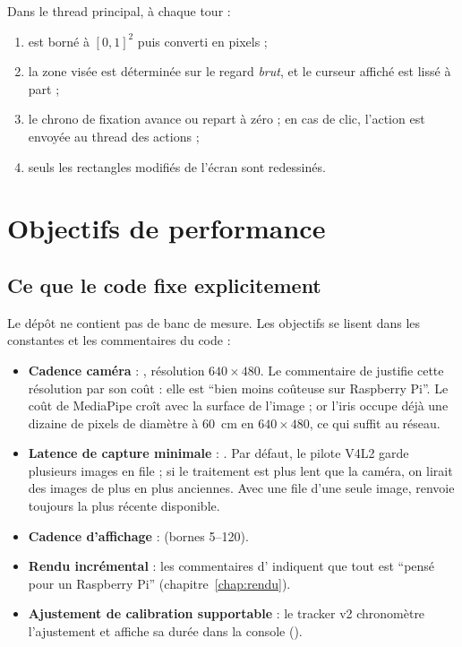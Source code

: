Dans le thread principal, à chaque tour :
\begin{enumerate}
  \item {} est borné à $[0, 1]^2$ puis converti en pixels ;
  \item la zone visée est déterminée sur le regard \emph{brut}, et le curseur affiché est lissé à part ;
  \item le chrono de fixation avance ou repart à zéro ; en cas de clic, l'action est envoyée au thread des actions ;
  \item seuls les rectangles modifiés de l'écran sont redessinés.
\end{enumerate}

\section{Objectifs de performance}
\label{sec:perf}

\subsection{Ce que le code fixe explicitement}

Le dépôt ne contient pas de banc de mesure. Les objectifs se lisent dans les constantes et les commentaires du code :

\begin{itemize}
  \item \textbf{Cadence caméra} : , résolution $640\times480$. Le commentaire de  justifie cette résolution par son coût : elle est \enquote{bien moins coûteuse sur Raspberry Pi}. Le coût de MediaPipe croît avec la surface de l'image ; or l'iris occupe déjà une dizaine de pixels de diamètre à \qty{60}{\centi\metre} en $640\times480$, ce qui suffit au réseau.
  \item \textbf{Latence de capture minimale} : . Par défaut, le pilote V4L2 garde plusieurs images en file ; si le traitement est plus lent que la caméra, on lirait des images de plus en plus anciennes. Avec une file d'une seule image,  renvoie toujours la plus récente disponible.
  \item \textbf{Cadence d'affichage} :  (bornes \numrange{5}{120}).
  \item \textbf{Rendu incrémental} : les commentaires d' indiquent que tout est \enquote{pensé pour un Raspberry Pi} (chapitre~\ref{chap:rendu}).
  \item \textbf{Ajustement de calibration supportable} : le tracker v2 chronomètre l'ajustement et affiche sa durée dans la console ().
\end{itemize}

